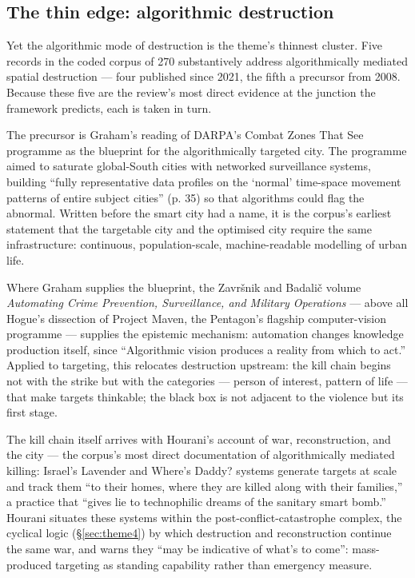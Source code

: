 \subsection{The thin edge: algorithmic destruction}
\label{sec:thin-edge}

Yet the algorithmic mode of destruction is the theme's thinnest cluster. Five records in the coded corpus of 270 substantively address algorithmically mediated spatial destruction — four published since 2021, the fifth a precursor from 2008. Because these five are the review's most direct evidence at the junction the framework predicts, each is taken in turn.

The precursor is Graham's \citeyearpar{graham2008} reading of DARPA's Combat Zones That See programme as the blueprint for the algorithmically targeted city. The programme aimed to saturate global-South cities with networked surveillance systems, building ``fully representative data profiles on the `normal' time-space movement patterns of entire subject cities'' (p. 35) so that algorithms could flag the abnormal. Written before the smart city had a name, it is the corpus's earliest statement that the targetable city and the optimised city require the same infrastructure: continuous, population-scale, machine-readable modelling of urban life.

Where Graham supplies the blueprint, the Završnik and Badalič volume \textit{Automating Crime Prevention, Surveillance, and Military Operations} \parencite{zavrsnik2021} — above all Hogue's \citeyearpar[p.~203]{hogue2021} dissection of Project Maven, the Pentagon's flagship computer-vision programme — supplies the epistemic mechanism: automation changes knowledge production itself, since ``Algorithmic vision produces a reality from which to act.'' Applied to targeting, this relocates destruction upstream: the kill chain begins not with the strike but with the categories — person of interest, pattern of life — that make targets thinkable; the black box is not adjacent to the violence but its first stage.

The kill chain itself arrives with Hourani's \citeyearpar[p.~3]{hourani2024} account of war, reconstruction, and the city — the corpus's most direct documentation of algorithmically mediated killing: Israel's Lavender and Where's Daddy? systems generate targets at scale and track them ``to their homes, where they are killed along with their families,'' a practice that ``gives lie to technophilic dreams of the sanitary smart bomb.'' Hourani situates these systems within the post-conflict-catastrophe complex, the cyclical logic (\S\ref{sec:theme4}) by which destruction and reconstruction continue the same war, and warns they ``may be indicative of what's to come'': mass-produced targeting as standing capability rather than emergency measure.

